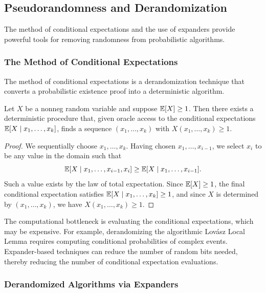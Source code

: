 \subsection{Pseudorandomness and Derandomization}

The method of conditional expectations and the use of expanders provide powerful tools for removing randomness from probabilistic algorithms.

\subsubsection*{The Method of Conditional Expectations}

The method of conditional expectations is a derandomization technique that converts a probabilistic existence proof into a deterministic algorithm.

\begin{theorem}
Let $X$ be a nonneg random variable and suppose $\operatorname{\mathbb{E}}[X] \geq 1$. Then there exists a deterministic procedure that, given oracle access to the conditional expectations $\operatorname{\mathbb{E}}[X \mid x_1, \ldots, x_k]$, finds a sequence $(x_1, \ldots, x_k)$ with $X(x_1, \ldots, x_k) \geq 1$.
\end{theorem}

\begin{proof}
We sequentially choose $x_1, \ldots, x_k$. Having chosen $x_1, \ldots, x_{i-1}$, we select $x_i$ to be any value in the domain such that
\[
\operatorname{\mathbb{E}}[X \mid x_1, \ldots, x_{i-1}, x_i] \geq \operatorname{\mathbb{E}}[X \mid x_1, \ldots, x_{i-1}].
\]
Such a value exists by the law of total expectation. Since $\operatorname{\mathbb{E}}[X] \geq 1$, the final conditional expectation satisfies $\operatorname{\mathbb{E}}[X \mid x_1, \ldots, x_k] \geq 1$, and since $X$ is determined by $(x_1, \ldots, x_k)$, we have $X(x_1, \ldots, x_k) \geq 1$.
\end{proof}

\begin{remark}
The computational bottleneck is evaluating the conditional expectations, which may be expensive. For example, derandomizing the algorithmic Lov\'asz Local Lemma requires computing conditional probabilities of complex events. Expander-based techniques can reduce the number of random bits needed, thereby reducing the number of conditional expectation evaluations.
\end{remark}

\subsubsection*{Derandomized Algorithms via Expanders}

